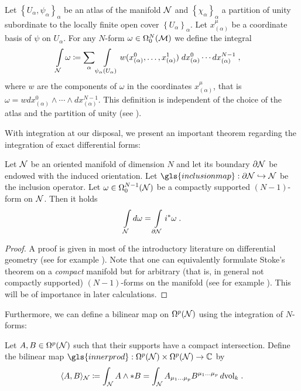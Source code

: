 \begin{definition}
	Let $\left\{U_\alpha, \psi_\alpha\right\}_\alpha$ be an atlas of the manifold $\mathcal{N}$ and $\left\{\chi_\alpha\right\}_\alpha$ a partition of unity subordinate to the locally finite open cover $\left\{U_\alpha\right\}_\alpha$. Let $x^\mu_{(\alpha)}$ be a coordinate basis of $\psi$ on $U_\alpha$. For any $N$-form $\omega \in \Omega^N_0(\mathcal{M})$ we define the integral
	\begin{align}
	\int\limits_{\mathcal{N}} \omega &\coloneqq \sum_{\alpha} \int\limits_{\psi_\alpha (U_\alpha)} w(x_{(\alpha)}^0,\dots,x_{(\alpha)}^1)\; dx_{(\alpha)}^0 \cdots dx_{(\alpha)}^{N-1} \;,
	\end{align}
	where $w$ are the components of $\omega$ in the coordinates $x_{(\alpha)}^\mu$, that is $\omega = w dx_{(\alpha)}^0 \wedge \cdots \wedge dx_{(\alpha)}^{N-1}$.
	This definition is independent of the choice of the atlas and the partition of unity (see \cite[Proposition 3.3]{bott_tu}).
\end{definition}
With integration at our disposal, we present an important theorem regarding the integration of exact differential forms:
\begin{theorem}\label{thm:stokes}
	Let $\mathcal{N}$ be an oriented manifold of dimension $N$ and let its boundary $\partial \mathcal{N}$ be endowed with the induced orientation. Let $\gls{inclusionmap} : \partial \N \hookrightarrow \N$ be the inclusion operator.
	Let $\omega \in \Omega^{N-1}_0(\mathcal{N})$ be a compactly supported $(N-1)$-form on $\mathcal{N}$. Then it holds
	\begin{align}
	\int\limits_{\mathcal{N}} d\omega = \int\limits_{\partial \mathcal{N}} i^*\omega \;.
	\end{align}
\end{theorem}
\begin{proof}
	A proof is given in most of the introductory literature on differential geometry (see for example \cite[Chapter 17, Theorem 2.1]{lang}).
	Note that one can equivalently formulate Stoke's theorem on a \emph{compact} manifold but for {arbitrary} (that is, in general not compactly supported) $(N-1)$-forms on the manifold (see for example \cite[Theorem 4.2.14]{rudolph_schmidt}). This will be of importance in later calculations.
\end{proof}
%
Furthermore, we can define a bilinear map on $\Omega^p(\mathcal{N})$ using the integration of $N$-forms:
\begin{definition}
	Let $A,B \in \Omega^p(\mathcal{N})$ such that their supports have a compact intersection. Define the bilinear map $\gls{innerprod} : \Omega^p(\N) \times \Omega^p(\N) \to \IC$ by
	\begin{align}
	\langle A, B \rangle_{\mathcal{N}} \coloneqq  \int_{\mathcal{N} } A \wedge * B = \int_{\mathcal{N} } A_{\mu_1 \dots \mu_p}B^{\mu_1 \dots \mu_p}\,d\textrm{vol}_k \;.
	\end{align}
\end{definition}
